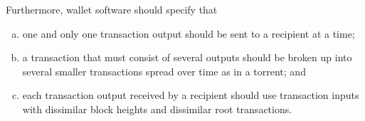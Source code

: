 \documentclass[12pt,english]{mrl}
\theoremstyle{definition}
\numberwithin{equation}{section}
\numberwithin{figure}{section}
\numberwithin{equation}{section}
\numberwithin{equation}{section}
\numberwithin{figure}{section}
\begin{document}
Furthermore, wallet software should specify that
\begin{enumerate}[(a)]
\item one and only one transaction output should be sent to a recipient at a time;
\item a transaction that must consist of several outputs should be broken up into several smaller transactions spread over time as in a torrent; and
\item each transaction output received by a recipient should use transaction inputs with dissimilar block heights and dissimilar root transactions.
\end{enumerate}

\end{document}
